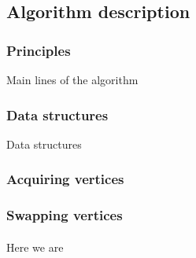 
\subsection{Algorithm description}
\subsubsection{Principles}
Main lines of the algorithm

\subsubsection{Data structures}
Data structures

\subsubsection{Acquiring vertices}

\subsubsection{Swapping vertices}

\paragraph{}
Here we are
\\

